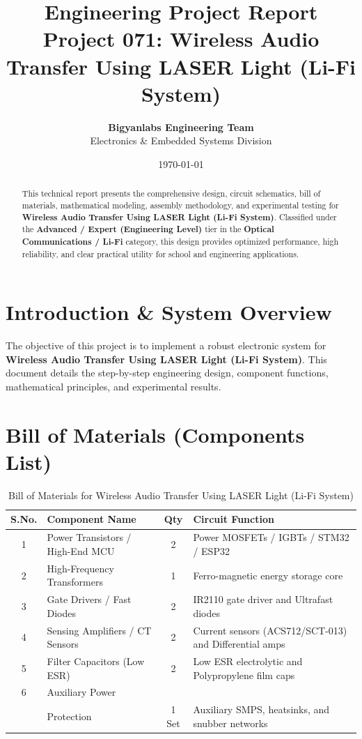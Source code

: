 \documentclass[11pt,a4paper]{article}
\title{\textbf{\Huge Engineering Project Report}\\[0.5em] \Large Project 071: Wireless Audio Transfer Using LASER Light (Li-Fi System)}
\author{\textbf{Bigyanlabs Engineering Team}\\ Electronics \& Embedded Systems Division}
\date{\today}
\begin{document}
\maketitle
\thispagestyle{empty}

\begin{abstract}
This technical report presents the comprehensive design, circuit schematics, bill of materials, mathematical modeling, assembly methodology, and experimental testing for \textbf{Wireless Audio Transfer Using LASER Light (Li-Fi System)}. Classified under the \textbf{Advanced / Expert (Engineering Level)} tier in the \textbf{Optical Communications / Li-Fi} category, this design provides optimized performance, high reliability, and clear practical utility for school and engineering applications.
\end{abstract}

\newpage
\tableofcontents
\newpage

\section{Introduction \& System Overview}
The objective of this project is to implement a robust electronic system for \textbf{Wireless Audio Transfer Using LASER Light (Li-Fi System)}. This document details the step-by-step engineering design, component functions, mathematical principles, and experimental results.

\section{Bill of Materials (Components List)}
\begin{table}[h!]
\centering
\caption{Bill of Materials for Wireless Audio Transfer Using LASER Light (Li-Fi System)}
\vspace{0.5em}
\begin{tabular}{clcp{7cm}}
\toprule
\textbf{S.No.} & \textbf{Component Name} & \textbf{Qty} & \textbf{Circuit Function} \\
\midrule
1 & Power Transistors / High-End MCU & 2 & Power MOSFETs / IGBTs / STM32 / ESP32 \\
2 & High-Frequency Transformers & 1 & Ferro-magnetic energy storage core \\
3 & Gate Drivers / Fast Diodes & 2 & IR2110 gate driver and Ultrafast diodes \\
4 & Sensing Amplifiers / CT Sensors & 2 & Current sensors (ACS712/SCT-013) and Differential amps \\
5 & Filter Capacitors (Low ESR) & 2 & Low ESR electrolytic and Polypropylene film caps \\
6 & Auxiliary Power \\& Protection & 1 Set & Auxiliary SMPS, heatsinks, and snubber networks \\
\bottomrule
\end{tabular}
\end{table}
\end{document}
